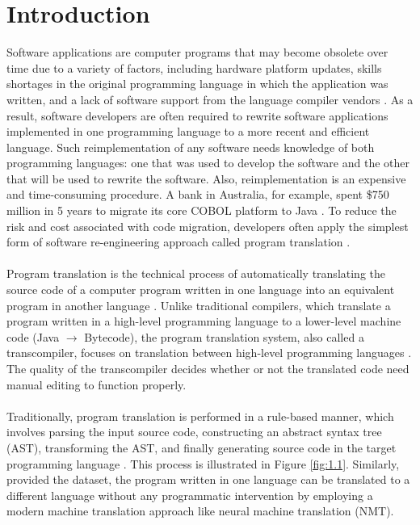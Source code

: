 \section{Introduction}
Software applications are computer programs that may become obsolete over time due to a variety of factors, including hardware platform updates, skills shortages in the original programming language in which the application was written, and a lack of software support from the language compiler vendors \cite{sommerville_2002}. As a result, software developers are often required to rewrite software applications implemented in one programming language to a more recent and efficient language. Such reimplementation of any software needs knowledge of both programming languages: one that was used to develop the software and the other that will be used to rewrite the software. Also, reimplementation is an expensive and time-consuming procedure. A bank in Australia, for example, spent \$750 million in 5 years to migrate its core COBOL platform to Java \cite{lachaux2020unsupervised}. To reduce the risk and cost associated with code migration, developers often apply the simplest form of software re-engineering approach called program translation \cite{sommerville_2002}.
\\\\
Program translation is the technical process of automatically translating the source code of a computer program written in one language into an equivalent program in another language \cite{ahmad2021avatar}. Unlike traditional compilers, which translate a program written in a high-level programming language to a lower-level machine code (Java $\rightarrow$ Bytecode), the program translation system, also called a transcompiler, focuses on translation between high-level programming languages \cite{zhu2022multilingual}. The quality of the transcompiler decides whether or not the translated code need manual editing to function properly. 
\\\\
Traditionally, program translation is performed in a rule-based manner, which involves parsing the input source code, constructing an abstract syntax tree (AST), transforming the AST, and finally generating source code in the target programming language \cite{taverna_2022}. This process is illustrated in Figure \ref{fig:1.1}. Similarly, provided the dataset, the program written in one language can be translated to a different language without any programmatic intervention by employing a modern machine translation approach like neural machine translation (NMT).
